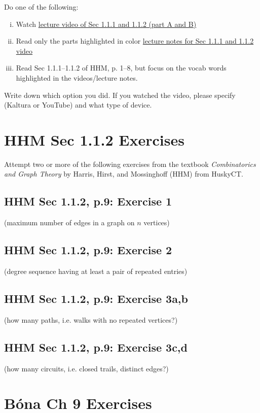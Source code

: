 \documentclass[10pt]{amsart}
\begin{document}
Do one of the following:
\begin{enumerate}[i.]
	\item Watch \href{}{lecture video of Sec 1.1.1 and 1.1.2 (part A and B)}
	\item Read only the parts highlighted in color  \href{https://egunawan.github.io/combinatorics/notes/notes1_1_2basics.pdf}{lecture notes for Sec 1.1.1 and 1.1.2 video}
	\item Read Sec 1.1.1--1.1.2 of HHM, p. 1--8, but focus on the vocab words highlighted in the videos/lecture notes.
\end{enumerate}

Write down which option you did. If you watched the video, please specify (Kaltura or YouTube) and what type of device.



\section{HHM Sec 1.1.2 Exercises}

Attempt two or more of the following exercises from the textbook \emph{Combinatorics and Graph Theory} by Harris, Hirst, and Mossinghoff (HHM) from HuskyCT.

\subsection*{
HHM Sec 1.1.2, p.9: Exercise 1
}
(maximum number of edges in a graph on $n$ vertices)

\subsection*{
HHM Sec 1.1.2, p.9: Exercise 2
}
(degree sequence having at least a pair of repeated entries)

\subsection*{
HHM Sec 1.1.2, p.9: Exercise 3a,b
}
(how many paths, i.e. walks with no repeated vertices?)

\subsection*{
HHM Sec 1.1.2, p.9: Exercise 3c,d
}
(how many circuits, i.e. closed trails, distinct edges?)


\section{B\'ona Ch 9 Exercises}
\end{document}
